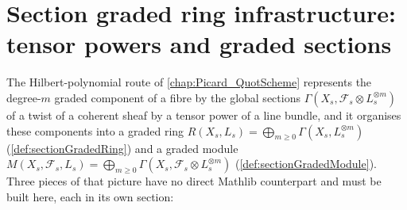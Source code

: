 \chapter{Section graded ring infrastructure: tensor powers and graded sections}
\label{chap:Picard_SectionGradedRing}

\providecommand{\PshMod}{\mathrm{PresheafOfModules}}
\providecommand{\ShMod}{\mathrm{SheafOfModules}}
\providecommand{\Modules}{\mathrm{Modules}}

The Hilbert-polynomial route of \cref{chap:Picard_QuotScheme} represents the
degree-\(m\) graded component of a fibre by the global sections
\(\Gamma(X_s, \mathcal{F}_s \otimes L_s^{\otimes m})\) of a twist of a coherent
sheaf by a tensor power of a line bundle, and it organises these components into
a graded ring \(R(X_s, L_s) = \bigoplus_{m \ge 0} \Gamma(X_s, L_s^{\otimes m})\)
(\cref{def:sectionGradedRing}) and a graded module
\(M(X_s, \mathcal{F}_s, L_s) = \bigoplus_{m \ge 0}
\Gamma(X_s, \mathcal{F}_s \otimes L_s^{\otimes m})\)
(\cref{def:sectionGradedModule}). Three pieces of that picture have no direct
Mathlib counterpart and must be built here, each in its own section:

